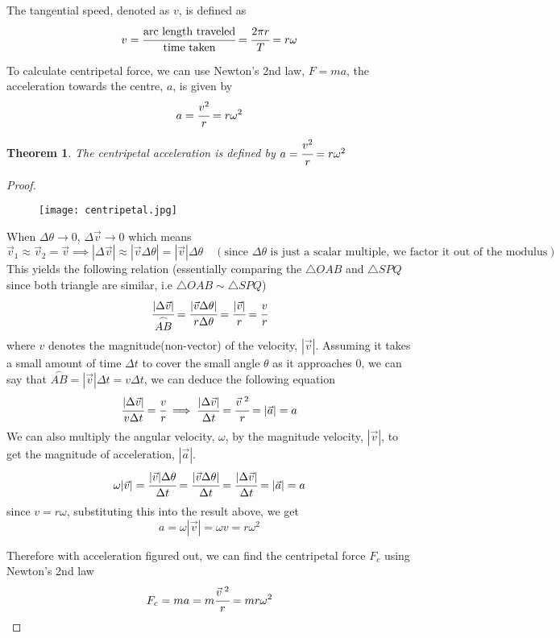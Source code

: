 \documentclass{article}
\newtheorem{theorem}{Theorem}[subsection]
\begin{document}
    The tangential speed, denoted as $v$, is defined as 
    $$v=\cfrac{\text{arc length traveled}}{\text{time taken}}=\cfrac{2\pi r }{T}=r\omega$$
    
    To calculate centripetal force, we can use Newton's 2nd law, $F=ma$, the acceleration towards the centre, $a$, is given by 
    $$a=\cfrac{v^2}{r}=r\omega^2$$ 
    
    \begin{theorem}
    The centripetal acceleration is defined by $a=\cfrac{v^2}{r}=r\omega^2$
    \end{theorem}
    
    \begin{proof}
    
    \begin{figure}[H]
        \centering
        \captionsetup{justification=centering,margin=2cm}
        \texttt{[image: centripetal.jpg]}
         \end{figure}
   
    When $\Delta \theta \rightarrow 0$, $\Delta \vec{v}\rightarrow0$ which means 
    $$\vec{v}_1\approx \vec{v}_2=\vec{v} \implies |\Delta \vec{v}| \approx |\vec{v} \Delta \theta| =|\vec{v}|\Delta \theta\quad (\text{since $\Delta \theta$ is just a scalar multiple, we factor it out of the modulus})$$
    This yields the following relation (essentially comparing the $\triangle OAB$ and $\triangle SPQ$ since both triangle are similar, i.e $\triangle OAB \sim \triangle SPQ$)
    $$\cfrac{|\Delta \vec{v}|}{\stackrel\frown{AB}}=\cfrac{|\vec{v}\Delta \theta|}{r\Delta \theta}=\cfrac{|\vec{v}|}{r}=\cfrac{v}{r}$$
    where $v$ denotes the magnitude(non-vector) of the velocity, $|\vec{v}|$. Assuming it takes a small amount of time $\Delta t$ to cover the small angle $\theta$ as it approaches $0$, we can say that $\stackrel\frown{AB}=|\vec{v}|\Delta t=v\Delta t$, we can deduce the following equation
    $$\cfrac{|\Delta \vec{v}|}{v\Delta t}=\cfrac{v}{r}\implies \cfrac{|\Delta \vec{v}|}{\Delta t}=\cfrac{{\vec{v}}^{\; 2}}{r}=|\vec{a}|=a$$
    \newpage
    We can also multiply the angular velocity, $\omega$, by the magnitude velocity, $|\vec{v}|$, to get the magnitude of acceleration, $|\vec{a}|$.
    $$\omega |\vec{v}|=\cfrac{|\vec{v}|\Delta \theta}{\Delta t}=\cfrac{|\vec{v}\Delta \theta|}{\Delta t}=\cfrac{|\Delta \vec{v}|}{\Delta t}=|\vec{a}|=a$$
    since $v=r\omega$, substituting this into the result above, we get
    $$a=\omega|\vec{v}|=\omega v=r\omega^2$$
    
    Therefore with acceleration figured out, we can find the centripetal force $F_c$ using Newton's 2nd law
    $$F_c=ma=m\cfrac{{\vec{v}}^{\; 2}}{r}=mr\omega^2$$
   \end{proof} 
\end{document}

